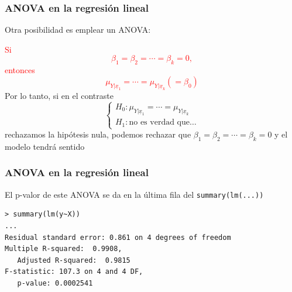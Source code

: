 \documentclass[12pt,t]{beamer}
\newcommand{\red}[1]{\textcolor{red}{#1}}
\theoremstyle{plain}
\theoremstyle{definition}
\begin{document}
\begin{frame}
\frametitle{ANOVA en la regresión lineal}

Otra posibilidad es emplear un ANOVA:
\medskip

\red{Si $$\beta_1=\beta_2=\cdots=\beta_k=0,$$ entonces $$\mu_{Y|\underline{x}_1}=\cdots=\mu_{Y|\underline{x}_k}(=\beta_0)$$}
Por lo tanto, si en el contraste
$$
\left\{\begin{array}{l}
H_0:\mu_{Y|\underline{x}_1}=\cdots=\mu_{Y|\underline{x}_k}\\
H_1:\mbox{no es verdad que\ldots}
\end{array}
\right.
$$
rechazamos la hipótesis nula, podemos rechazar que $\beta_1=\beta_2=\cdots=\beta_k=0$
y el modelo tendrá sentido
\end{frame}




\begin{frame}[fragile]
\frametitle{ANOVA en la regresión lineal}
El p-valor de este ANOVA se da en la última fila del \texttt{summary(lm(...))}\medskip

\begin{lstlisting}
> summary(lm(y~X))
...
Residual standard error: 0.861 on 4 degrees of freedom
Multiple R-squared:  0.9908,	
   Adjusted R-squared:  0.9815 
F-statistic: 107.3 on 4 and 4 DF,  
   p-value: 0.0002541
\end{lstlisting}

\end{frame}
\end{document}
